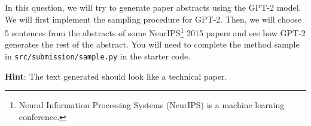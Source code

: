 \item {}

In this question, we will try to generate paper abstracts using the GPT-2 model. We will first implement the sampling
procedure for GPT-2. Then, we will choose 5 sentences from the abstracts of some NeurIPS\footnote{Neural Information Processing Systems (NeurIPS) is a machine learning conference.} 2015 papers and see how GPT-2 generates the 
rest of the abstract. You will need to complete the method sample in \texttt{src/submission/sample.py} in the starter code.

\textbf{Hint}: The text generated should look like a technical paper.